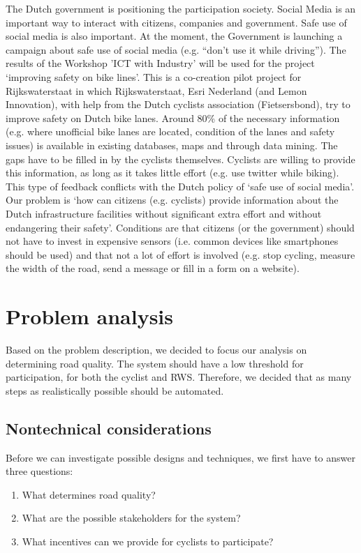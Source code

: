 \documentclass[a4paper,11pt]{article}
\begin{document}
The Dutch government is positioning the participation society. 
Social Media is an important way to interact with citizens, companies and government. 
Safe use of social media is also important. At the moment, the Government is launching a 
campaign about safe use of social media (e.g. ``don't use it while driving'').
The results of the Workshop 'ICT with Industry' will be used for the project 
`improving safety on bike lines'. This is a co-creation pilot project for Rijkswaterstaat in 
which Rijkswaterstaat, Esri Nederland (and Lemon Innovation), with help from 
the Dutch cyclists association (Fietsersbond), try to improve safety on Dutch bike lanes. 
Around 80\% of the necessary information (e.g. where unofficial bike lanes are located, 
condition of the lanes and safety issues) is available in existing databases, 
maps and through data mining. The gaps have to be filled in by the cyclists themselves. 
Cyclists are willing to provide this information, as long as it takes little effort (e.g. use twitter while biking). 
This type of feedback conflicts with the Dutch policy of `safe use of social media'.
Our problem is `how can citizens (e.g. cyclists) provide information about the Dutch infrastructure 
facilities without significant extra effort and without endangering their safety'.
Conditions are that citizens (or the government) should not have to invest in expensive sensors 
(i.e. common devices like smartphones should be used) and 
that not a lot of effort is involved 
(e.g. stop cycling, measure the width of the road, send a message or fill in a form on a website).

\section{Problem analysis}

Based on the problem description, we decided to focus our analysis on determining road quality. 
The system should have a low threshold for participation, for both the cyclist and RWS.
Therefore, we decided that as many steps as realistically possible should be automated.

\subsection{Nontechnical considerations}

Before we can investigate possible designs and techniques, we first have to answer three questions:
\begin{enumerate}\setlength{\itemsep}{-3pt}
\item What determines road quality?
\item What are the possible stakeholders for the system?
\item What incentives can we provide for cyclists to participate?
\end{enumerate}
\end{document}
